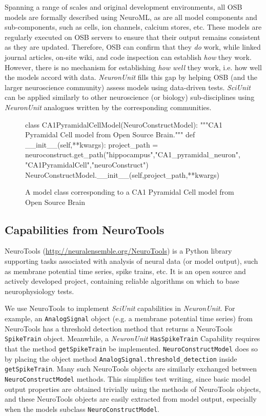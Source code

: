 \documentclass{frontiersSCNS}
\let\verbx\lstinline
\begin{document}
Spanning a range of scales and original development environments, all OSB models are formally described using NeuroML, as are all model components and sub-components, such as cells, ion channels, calcium stores, etc. 
These models are regularly executed on OSB servers to ensure that their output remains consistent as they are updated. 
Therefore, OSB can confirm that they \textit{do} work, while linked journal articles, on-site wiki, and code inspection can establish \textit{how} they work. 
However, there is no mechanism for establishing \textit{how well} they work, i.e. how well the models accord with data. 
\textit{NeuronUnit} fills this gap by helping OSB (and the larger neuroscience community) assess models using data-driven tests. 
\textit{SciUnit} can be applied similarly to other neuroscience (or biology) sub-disciplines using \textit{NeuronUnit} analogues written by the corresponding communities.    

\begin{figure}
\begin{python}
class CA1PyramidalCellModel(NeuroConstructModel):
	"""CA1 Pyramidal Cell model from Open Source Brain."""
	def __init__(self,**kwargs):
		project_path = neuroconstruct.get_path("hippocampus","CA1_pyramidal_neuron","CA1PyramidalCell","neuroConstruct")
		NeuroConstructModel.__init__(self,project_path,**kwargs)
\end{python}
\vspace{-5px}
\caption{A model class corresponding to a CA1 Pyramidal Cell model from Open Source Brain}
\label{fig:ca1_model}
\vspace{-15px}
\end{figure}

\subsection{Capabilities from NeuroTools}
NeuroTools (\url{http://neuralensemble.org/NeuroTools}) is a Python library supporting tasks associated with analysis of neural data (or model output), such as membrane potential time series, spike trains, etc. 
It is an open source and actively developed project, containing reliable algorithms on which to base neurophysiology tests.

We use NeuroTools to implement \textit{SciUnit} capabilities in \textit{NeuronUnit}. 
For example, an \verbx{AnalogSignal} object (e.g. a membrane potential time series) from NeuroTools has a threshold detection method that returns a NeuroTools \verbx{SpikeTrain} object. 
Meanwhile, a \textit{NeuronUnit} \verbx{HasSpikeTrain} Capability requires that the method \verbx{getSpikeTrain} be implemented. 
\verbx{NeuroConstructModel} does so by placing the object method \verbx{AnalogSignal.threshold_detection} inside \verbx{getSpikeTrain}. 
Many such NeuroTools objects are similarly exchanged between \verbx{NeuroConstructModel} methods. 
This simplifies test writing, since basic model output properties are obtained trivially using the methods of NeuroTools objects, and these NeuroTools objects are easily extracted from model output, especially when the models subclass \verbx{NeuroConstructModel}.  
\end{document}
